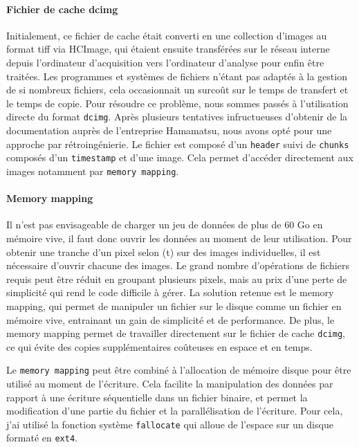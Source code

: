 \paragraph{Fichier de cache dcimg}
Initialement, ce fichier de cache était converti en une collection d'images au format tiff via HCImage, qui étaient ensuite transférées sur le réseau interne depuis l'ordinateur d'acquisition vers l'ordinateur d'analyse pour enfin être traitées. Les programmes et systèmes de fichiers n'étant pas adaptés à la gestion de si nombreux fichiers, cela occasionnait un surcoût sur le temps de transfert et le temps de copie. Pour résoudre ce problème, nous sommes passés à l'utilisation directe du format \verb|dcimg|. Après plusieurs tentatives infructueuses d'obtenir de la documentation auprès de l'entreprise Hamamatsu, nous avons opté pour une approche par rétroingénierie. Le fichier est composé d'un \verb|header| suivi de \verb|chunks| composés d'un \verb|timestamp| et d'une image. Cela permet d'accéder directement aux images notamment par \verb|memory mapping|.


\paragraph{Memory mapping}
Il n'est pas envisageable de charger un jeu de données de plus de 60 Go en mémoire vive, il faut donc ouvrir les données au moment de leur utilisation. Pour obtenir une tranche d'un pixel selon (t) sur des images individuelles, il est nécessaire d'ouvrir chacune des images. Le grand nombre d'opérations de fichiers requis peut être réduit en groupant plusieurs pixels, mais au prix d'une perte de simplicité qui rend le code difficile à gérer. La solution retenue est le memory mapping, qui permet de manipuler un fichier sur le disque comme un fichier en mémoire vive, entrainant un gain de simplicité et de performance. De plus, le memory mapping permet de travailler directement sur le fichier de cache \verb|dcimg|, ce qui évite des copies supplémentaires coûteuses en espace et en temps.

Le \verb|memory mapping| peut être combiné à l'allocation de mémoire disque pour être utilisé au moment de l'écriture. Cela facilite la manipulation des données par rapport à une écriture séquentielle dans un fichier binaire, et permet la modification d'une partie du fichier et la parallélisation de l'écriture. Pour cela, j'ai utilisé la fonction système \verb|fallocate| qui alloue de l'espace sur un disque formaté en \verb|ext4|.

